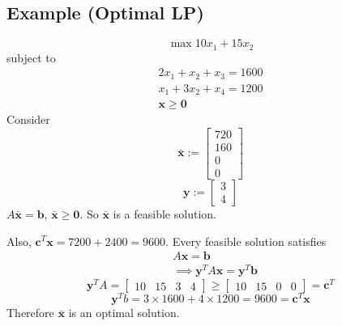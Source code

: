 \subsection{Example (Optimal LP)}
\[\max 10x_1+15x_2\]
subject to
\begin{align*}
    2x_1+x_2+x_3=1600\\
    x_1+3x_2+x_4=1200\\
    \mathbf{x}\ge \mathbf{0}
\end{align*}
Consider
\[\bar{\mathbf{x}}:=
\begin{bmatrix}
    720\\
    160\\
    0\\
    0
\end{bmatrix}\]
\[\mathbf{y}:=
\begin{bmatrix}
    3\\
    4
\end{bmatrix}
\]
$A\bar{\mathbf{x}}=\mathbf{b}$, $\bar{\mathbf{x}}\ge \mathbf{0}$. So $\bar{\mathbf{x}}$ is a feasible solution.


Also, $\mathbf{c}^T\mathbf{x}=7200+2400=9600$.
Every feasible solution satisfies
\begin{align*}
    &A\mathbf{x}=\mathbf{b}\\
    &\implies \mathbf{y}^TA\mathbf{x}=\mathbf{y}^T\mathbf{b}
\end{align*}
\[\mathbf{y}^TA=
\begin{bmatrix}
    10 & 15 & 3 & 4
\end{bmatrix}
\ge
\begin{bmatrix}
    10 & 15 & 0 & 0
\end{bmatrix}=\mathbf{c}^T\]
\[\mathbf{y}^Tb=3\times 1600+4\times 1200=9600=\mathbf{c}^T\mathbf{x}\]
Therefore $\bar{\mathbf{x}}$ is an optimal solution.
